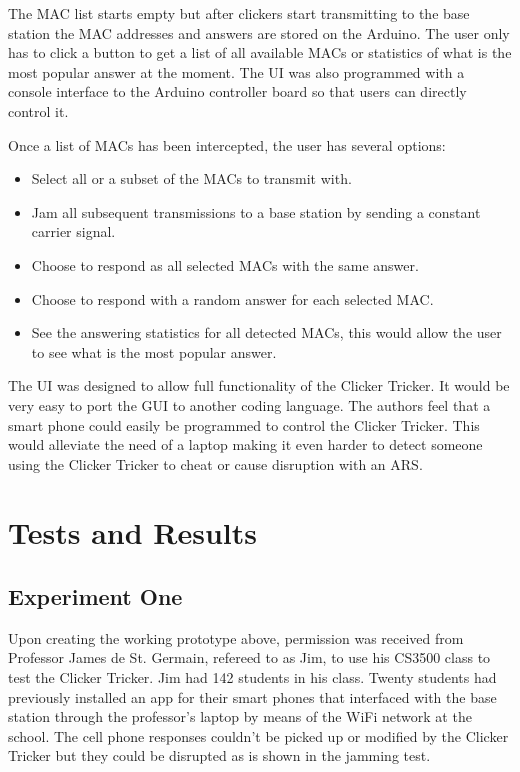 The MAC list starts empty but after clickers start transmitting to the base station the MAC addresses and answers are stored on the Arduino.  The user only has to click a button to get a list of all available MACs or statistics of what is the most popular answer at the moment.  The UI was also programmed with a console interface to the Arduino controller board so that users can directly control it.

Once a list of MACs has been intercepted, the user has several options:
\begin{itemize}
\item Select all or a subset of the MACs to transmit with.
\item Jam all subsequent transmissions to a base station by sending a constant carrier signal.
\item Choose to respond as all selected MACs with the same answer.
\item Choose to respond with a random answer for each selected MAC.
\item See the answering statistics for all detected MACs, this would allow the user to see what is the most popular answer.
\end{itemize}

The UI was designed to allow full functionality of the Clicker Tricker.  It would be very easy to port the GUI to another coding language.  The authors feel that a smart phone could easily be programmed to control the Clicker Tricker.  This would alleviate the need of a laptop making it even harder to detect someone using the Clicker Tricker to cheat or cause disruption with an ARS.

\section{Tests and Results}

\subsection*{Experiment One}

Upon creating the working prototype above, permission was received from Professor James de St. Germain, refereed to as Jim, to use his CS3500 class to test the Clicker Tricker.  Jim had 142 students in his class. Twenty students had previously installed an app for their smart phones that interfaced with the base station through the professor's laptop by means of the WiFi network at the school.  The cell phone responses couldn't be picked up or modified by the Clicker Tricker but they could be disrupted as is shown in the jamming test.

